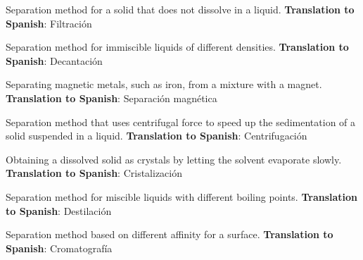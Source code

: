 \begin{vocabulary}[Filtration]
    Separation method for a solid that does not dissolve in a liquid. \newline
    \textbf{Translation to Spanish}: Filtración
\end{vocabulary}

\begin{vocabulary}[Decantation]
    Separation method for immiscible liquids of different densities. \newline
    \textbf{Translation to Spanish}: Decantación
\end{vocabulary}

\begin{vocabulary}
    Separating magnetic metals, such as iron, from a mixture with a magnet. \newline
    \textbf{Translation to Spanish}: Separación magnética
\end{vocabulary}

\begin{vocabulary}[Centrifugation]
    Separation method that uses centrifugal force to speed up the sedimentation of a solid suspended in a liquid. \newline
    \textbf{Translation to Spanish}: Centrifugación
\end{vocabulary}

\begin{vocabulary}[Crystallisation]
    Obtaining a dissolved solid as crystals by letting the solvent evaporate slowly. \newline
    \textbf{Translation to Spanish}: Cristalización
\end{vocabulary}

\begin{vocabulary}[Distillation]
    Separation method for miscible liquids with different boiling points. \newline
    \textbf{Translation to Spanish}: Destilación
\end{vocabulary}

\begin{vocabulary}[Chromatography]
    Separation method based on different affinity for a surface. \newline
    \textbf{Translation to Spanish}: Cromatografía
\end{vocabulary}
